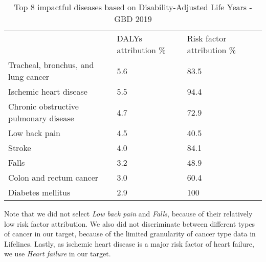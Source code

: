 \begin{table}[H]
    \centering
    \caption{Top 8 impactful diseases based on Disability-Adjusted Life Years - GBD 2019}
    \begin{tabular}{lll}
        \cline{1-3}
         & DALYs attribution \% & Risk factor attribution \%\\ \cline{1-3}
    Tracheal, bronchus, and lung cancer   & 5.6 & 83.5 \\
    Ischemic heart disease   & 5.5 & 94.4 \\
    Chronic obstructive pulmonary disease  & 4.7 & 72.9 \\
    Low back pain   & 4.5 & 40.5 \\
    Stroke   & 4.0 & 84.1 \\
    Falls   & 3.2 & 48.9 \\
    Colon and rectum cancer   & 3.0 & 60.4 \\
    Diabetes mellitus   & 2.9 & 100 \\
    \cline{1-3}
    \end{tabular}
    \label{table:data:global_burden_of_disease}
\end{table}

Note that we did not select \textit{Low back pain} and \textit{Falls}, because of their relatively low risk factor attribution. We also did not discriminate between different types of cancer in our target, because of the limited granularity of cancer type data in Lifelines. Lastly, as ischemic heart disease is a major risk factor of heart failure, we use \textit{Heart failure} in our target.


